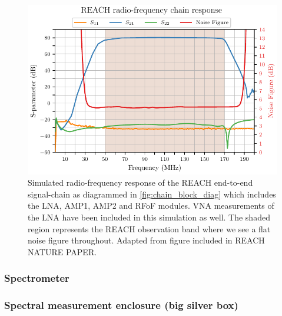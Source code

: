 \begin{figure}
    \centering
    \includegraphics[width=\textwidth]{chain_sim}
    \caption{Simulated radio-frequency response of the REACH end-to-end signal-chain as diagrammed in \cref{fig:chain_block_diag} which includes the LNA, AMP1, AMP2 and RFoF modules. VNA measurements of the LNA have been included in this simulation as well. The shaded region represents the REACH observation band where we see a flat noise figure throughout. Adapted from figure included in REACH NATURE PAPER.}
    \label{fig:chain_sim}
\end{figure}


\subsubsection{Spectrometer}


\subsubsection{Spectral measurement enclosure (big silver box)}


